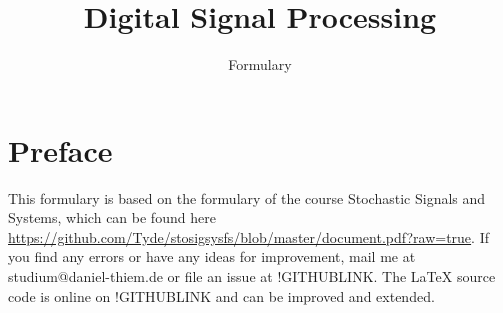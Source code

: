\documentclass[accentcolor=tud9c,9.5pt,nochapname,bigchapter,paper=a5report]{tudreport}
\begin{document}
\def\Var{{\rm Var}\,}
\def\E{{\rm E}\,}
\def\freq{{(e^{j\omega})}\,}


\title{Digital Signal Processing}
\subtitle{Formulary}

\maketitle
\newpage
\thispagestyle{plain}
\mbox{}
\tableofcontents


\section*{Preface}
This formulary is based on the formulary of the course Stochastic Signals and Systems,
 which can be found here \url{https://github.com/Tyde/stosigsysfs/blob/master/document.pdf?raw=true}.
If you find any errors or have any ideas for improvement, mail me at studium@daniel-thiem.de
 or file an issue at !GITHUBLINK. The \LaTeX{}  source code is
online on !GITHUBLINK and can be improved and extended.
\end{document}
